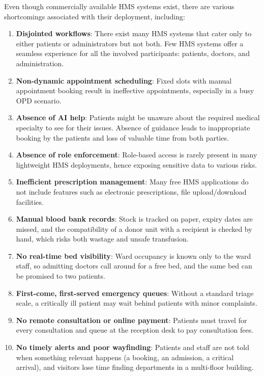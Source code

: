 Even though commercially available HMS systems exist, there are various shortcomings associated with their deployment, including:

\begin{enumerate}
    \item \textbf{Disjointed workflows}: There exist many HMS systems that cater only to either patients or administrators but not both. Few HMS systems offer a seamless experience for all the involved participants: patients, doctors, and administration.
    \item \textbf{Non-dynamic appointment scheduling}: Fixed slots with manual appointment booking result in ineffective appointments, especially in a busy OPD scenario.
    \item \textbf{Absence of AI help}: Patients might be unaware about the required medical specialty to see for their issues. Absence of guidance leads to inappropriate booking by the patients and loss of valuable time from both parties.
    \item \textbf{Absence of role enforcement}: Role-based access is rarely present in many lightweight HMS deployments, hence exposing sensitive data to various risks.
    \item \textbf{Inefficient prescription management}: Many free HMS applications do not include features such as electronic prescriptions, file upload/download facilities.
    \item \textbf{Manual blood bank records}: Stock is tracked on paper, expiry dates are missed, and the compatibility of a donor unit with a recipient is checked by hand, which risks both wastage and unsafe transfusion.
    \item \textbf{No real-time bed visibility}: Ward occupancy is known only to the ward staff, so admitting doctors call around for a free bed, and the same bed can be promised to two patients.
    \item \textbf{First-come, first-served emergency queues}: Without a standard triage scale, a critically ill patient may wait behind patients with minor complaints.
    \item \textbf{No remote consultation or online payment}: Patients must travel for every consultation and queue at the reception desk to pay consultation fees.
    \item \textbf{No timely alerts and poor wayfinding}: Patients and staff are not told when something relevant happens (a booking, an admission, a critical arrival), and visitors lose time finding departments in a multi-floor building.
\end{enumerate}

